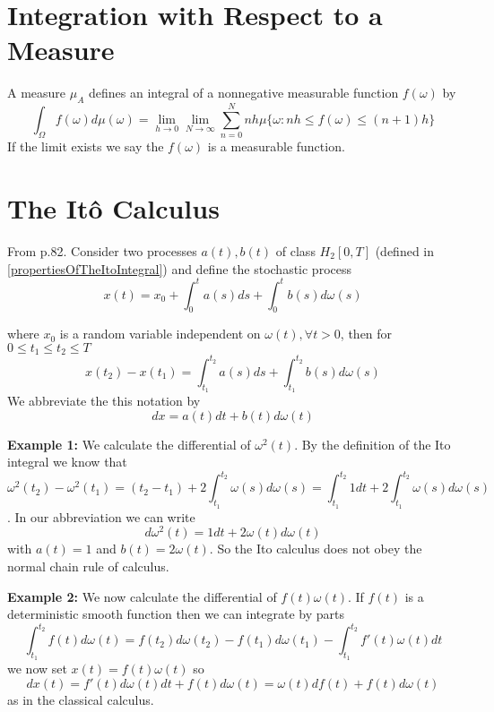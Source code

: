 \documentclass[12pt]{report}
\begin{document}
\section{Integration with Respect to a Measure}
A measure $\mu_A$ defines an integral of a nonnegative measurable function $f(\omega)$ by 
\begin{equation*}
\int_{\Omega}f(\omega)d\mu(\omega)=\lim_{h\rightarrow 0}\lim_{N\rightarrow \infty}\sum_{n=0}^{N}nh\mu\{\omega: nh\leq f(\omega)\leq(n+1)h\}
\end{equation*}
If the limit exists we say the $f(\omega)$ is a measurable function. 


\section{The It\^{o} Calculus}
From \cite{schuss2009theory} p.82. Consider two processes $a(t),b(t)$ of class $H_2[0,T]$ (defined in \ref{propertiesOfTheItoIntegral}) and define the stochastic process
\begin{equation*}
x(t) = x_0 + \int_0^t a(s)ds + \int_0^t b(s)d\omega(s)
\end{equation*}

where $x_0$ is a random variable independent on $\omega(t),\forall t>0$, then for $0\leq t_1\leq t_2 \leq T$
\begin{equation*}
x(t_2)-x(t_1)=\int_{t_1}^{t_2}a(s)ds +\int_{t_1}^{t_2}b(s)d\omega(s)
\end{equation*}
We abbreviate the this notation by 
\begin{equation*}
dx=a(t)dt+b(t)d\omega(t)
\end{equation*}

\textbf{Example 1:} We calculate the differential of $\omega^2(t)$. By the definition of the Ito integral we know that 
\begin{equation*}
\omega^2(t_2)-\omega^2(t_1)=(t_2-t_1)+2\int_{t_1}^{t_2}\omega(s)d\omega(s)=\int_{t_1}^{t_2}1dt+2\int_{t_1}^{t_2}\omega(s)d\omega(s)
\end{equation*}. 
In our abbreviation we can write 
\begin{equation*}
d\omega^2(t) = 1dt+2\omega(t)d\omega(t)
\end{equation*}
with $a(t)=1$ and $b(t)=2\omega(t)$. So the Ito calculus does not obey the normal chain rule of calculus.

\textbf{Example 2:} We now calculate the differential of $f(t)\omega(t)$. If $f(t)$ is a deterministic smooth function then we can integrate by parts
\begin{equation*}
\int_{t_1}^{t_2}f(t)d\omega(t)= f(t_2)d\omega(t_2)-f(t_1)d\omega(t_1)-\int_{t_1}^{t_2}f'(t)\omega(t)dt
\end{equation*}
we now set $x(t)= f(t)\omega(t)$ so 
\begin{equation*}
dx(t) = f'(t)d\omega(t)dt+f(t)d\omega(t)=\omega(t)df(t)+f(t)d\omega(t)
\end{equation*}
as in the classical calculus. 
\end{document}
